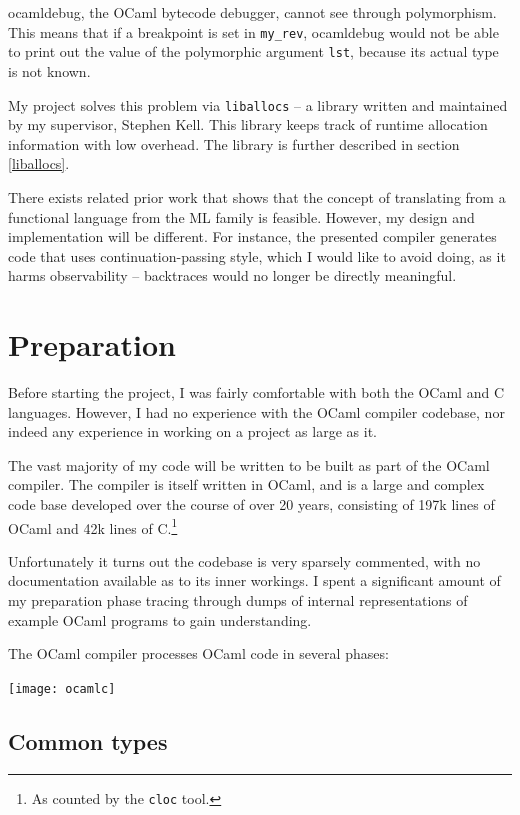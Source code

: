 \documentclass[12pt,a4paper,twoside,openright]{report}
\begin{document}
ocamldebug, the OCaml bytecode debugger, cannot see through
polymorphism. This means that if a breakpoint is set in \lstinline!my_rev!,
ocamldebug would not be able to print out the value of the polymorphic argument
\lstinline!lst!, because its actual type is not known.

My project solves this problem via \lstinline!liballocs! -- a library
written and maintained by my supervisor, Stephen Kell.\cite{kell} This library
keeps track of runtime allocation information with low overhead. The library is
further described in section \ref{liballocs}.

There exists related prior work \cite{tarditi90} that shows that the
concept of translating from a functional language from the ML family is
feasible. However, my design and implementation will be different.  For
instance, the presented compiler generates code that uses continuation-passing
style, which I would like to avoid doing, as it harms observability --
backtraces would no longer be directly meaningful.


\chapter{Preparation}

Before starting the project, I was fairly comfortable with both the OCaml and
C languages. However, I had no experience with the OCaml compiler codebase, nor
indeed any experience in working on a project as large as it.

The vast majority of my code will be written to be built as part of the OCaml
compiler. The compiler is itself written in OCaml, and is a large and complex
code base developed over the course of over 20 years, consisting of 197k lines
of OCaml and 42k lines of C.\footnote{As counted by the \lstinline!cloc! tool.}

Unfortunately it turns out the codebase is very sparsely commented, with no
documentation available as to its inner workings. I spent a significant amount of
my preparation phase tracing through dumps of internal representations of
example OCaml programs to gain understanding.

The OCaml compiler processes OCaml code in several phases:

\begin{center}
  \texttt{[image: ocamlc]}
\end{center}


\section{Common types}\label{common-types}
\end{document}

